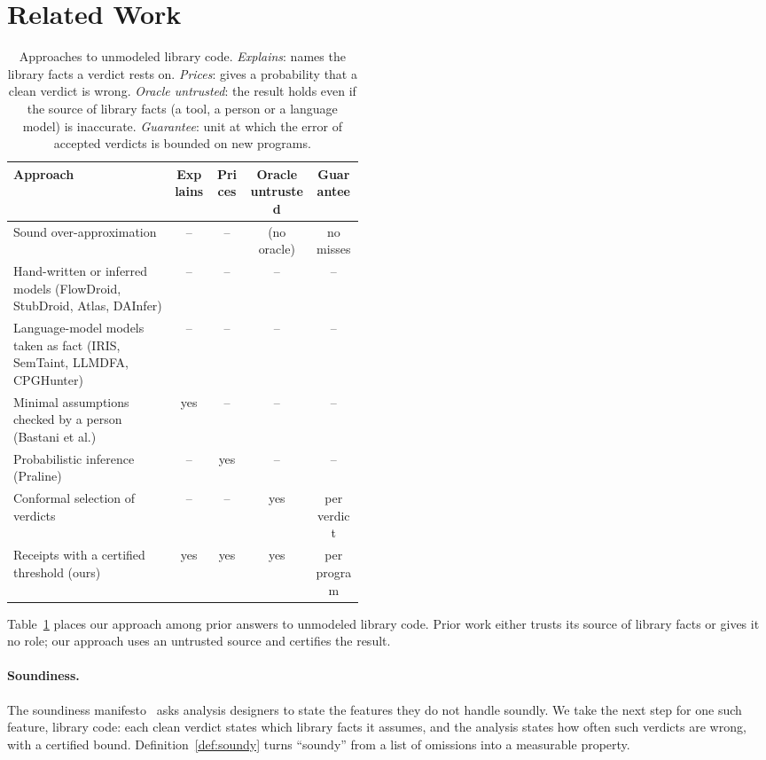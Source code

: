 \section{Related Work}
\label{sec:related}

\begin{table}[t]
\caption{Approaches to unmodeled library code. \emph{Explains}: names the library facts a verdict rests on. \emph{Prices}: gives a probability that a clean verdict is wrong. \emph{Oracle untrusted}: the result holds even if the source of library facts (a tool, a person or a language model) is inaccurate. \emph{Guarantee}: unit at which the error of accepted verdicts is bounded on new programs.}
\label{tab:related}
\small
\begin{tabular}{@{}>{\raggedright\arraybackslash}p{0.46\linewidth}cccc@{}}
\toprule
Approach & Explains & Prices & Oracle untrusted & Guarantee\\
\midrule
Sound over-approximation & -- & -- & (no oracle) & no misses \\
Hand-written or inferred models (FlowDroid, StubDroid, Atlas, DAInfer) & -- & -- & -- & --\\
Language-model models taken as fact (IRIS, SemTaint, LLMDFA, CPGHunter) & -- & -- & -- & --\\
Minimal assumptions checked by a person (Bastani et al.) & yes & -- & -- & --\\
Probabilistic inference (Praline) & -- & yes & -- & --\\
Conformal selection of verdicts & -- & -- & yes & per verdict\\
Receipts with a certified threshold (ours) & yes & yes & yes & per program\\
\bottomrule
\end{tabular}
\end{table}

Table~\ref{tab:related} places our approach among prior answers to unmodeled library code.
Prior work either trusts its source of library facts or gives it no role; our approach uses an untrusted source and certifies the result.

\paragraph{Soundiness.}
The soundiness manifesto~\cite{soundiness} asks analysis designers to state the features they do not handle soundly.
We take the next step for one such feature, library code: each clean verdict states which library facts it assumes, and the analysis states how often such verdicts are wrong, with a certified bound.
Definition~\ref{def:soundy} turns ``soundy'' from a list of omissions into a measurable property.

